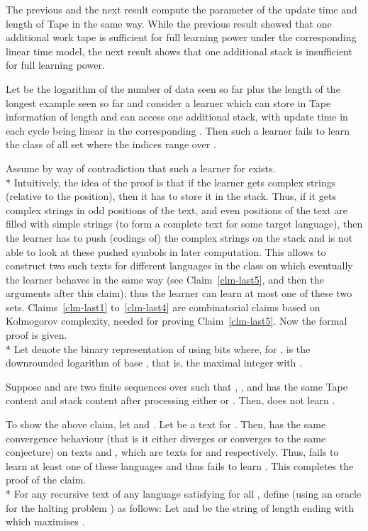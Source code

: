 \documentclass{LMCS}
\theoremstyle{plain}\newtheorem{athm}[thm]{Theorem}
\theoremstyle{plain}\newtheorem{aprop}[thm]{Proposition}
\theoremstyle{plain}\newtheorem{aprob}[thm]{Open Problem}
\theoremstyle{plain}\newtheorem{acor}[thm]{Corollary}
\theoremstyle{plain}\newtheorem{alem}[thm]{Lemma}
\theoremstyle{definition}\newtheorem{adefn}[thm]{Definition}
\theoremstyle{definition}\newtheorem{arem}[thm]{Remark}
\theoremstyle{plain}\newtheorem{aexmp}[thm]{Example}
\theoremstyle{plain}\newtheorem{aclm}[thm]{Claim}
\def\sp{\\*\indent}
\begin{document}
\noindent
The previous and the next result compute the parameter 
of the update time and length of Tape  in the same way. While the previous
result showed that one additional work tape is sufficient for full
learning power
under the corresponding linear time model, the next result shows that one
additional stack is insufficient for full learning power.

\begin{thm}
Let  be the logarithm of the number
of data seen so far plus the length of the longest example seen so far
and consider a learner which can store in Tape  information of length 
and can access one additional stack, with
update time in each cycle being linear in the corresponding .
Then such a learner fails to learn the class 
of all set  where the indices 
range over .
\end{thm}

\proof
Assume by way of contradiction that such a learner  for 
exists. 
\sp
Intuitively, the idea of the proof is that if the learner gets
complex strings (relative to the position), 
then it has to store it in the stack. Thus, if it gets complex strings
in odd positions of the text, and even positions of the text
are filled with simple strings (to form a complete text for some 
target language), then
the learner has to push (codings of) the complex strings on the stack and 
is not able to look at these pushed symbols in later computation.
This allows to construct two such texts for different languages in
the class on which eventually the learner behaves in the same way
(see Claim~\ref{clm-last5}, and then the arguments after this claim);
thus the learner can learn at most one of these two sets.
Claims~\ref{clm-last1} to~\ref{clm-last4} are combinatorial claims 
based on Kolmogorov complexity, needed for proving Claim~\ref{clm-last5}.
Now the formal proof is given.
\sp
Let  denote the binary representation of  using  bits
where, for ,   is the downrounded logarithm of base
, that is, the
maximal integer  with .

\begin{clm}\label{clm-last1}
Suppose  and  are two finite sequences over  such that
,
,
and  has the same Tape  content and stack content 
after processing either  or . Then,  does not learn .
\end{clm}

\noindent
To show the above claim, let 
and .
Let  be a text for . Then,
 has the same convergence behaviour (that is it either diverges or converges
to the same conjecture) on texts  and , which are
texts for  and  respectively. Thus,  fails to learn at least
one of these languages and thus fails to learn .
This completes the proof of the claim.
\sp
For any recursive text  of any language
satisfying  for all ,
define  (using an oracle for the halting problem ) as follows:
Let 
and  be the string  of length  ending
with  which maximises .
\end{document}
